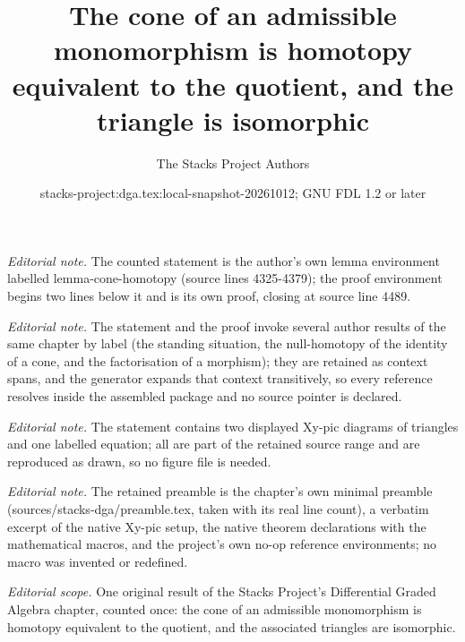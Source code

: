 \documentclass{stacks-project}
\title{The cone of an admissible monomorphism is homotopy equivalent to the quotient, and the triangle is isomorphic}
\author{The Stacks Project Authors}
\date{stacks-project:dga.tex:local-snapshot-20261012; GNU FDL 1.2 or later}
\theoremstyle{plain}
\theoremstyle{definition}
\theoremstyle{remark}
\numberwithin{equation}{subsection}
\begin{document}
\maketitle
\noindent\textit{Editorial note.} The counted statement is the author's own lemma environment labelled lemma-cone-homotopy (source lines 4325-4379); the proof environment begins two lines below it and is its own proof, closing at source line 4489.\par\medskip
\noindent\textit{Editorial note.} The statement and the proof invoke several author results of the same chapter by label (the standing situation, the null-homotopy of the identity of a cone, and the factorisation of a morphism); they are retained as context spans, and the generator expands that context transitively, so every reference resolves inside the assembled package and no source pointer is declared.\par\medskip
\noindent\textit{Editorial note.} The statement contains two displayed Xy-pic diagrams of triangles and one labelled equation; all are part of the retained source range and are reproduced as drawn, so no figure file is needed.\par\medskip
\noindent\textit{Editorial note.} The retained preamble is the chapter's own minimal preamble (sources/stacks-dga/preamble.tex, taken with its real line count), a verbatim excerpt of the native Xy-pic setup, the native theorem declarations with the mathematical macros, and the project's own no-op reference environments; no macro was invented or redefined.\par\medskip
\noindent\textit{Editorial scope.} One original result of the Stacks Project's Differential Graded Algebra chapter, counted once: the cone of an admissible monomorphism is homotopy equivalent to the quotient, and the associated triangles are isomorphic.\par\medskip
\end{document}
